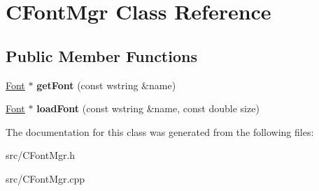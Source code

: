 \hypertarget{class_c_font_mgr}{
\section{CFontMgr Class Reference}
\label{class_c_font_mgr}
}
\subsection*{Public Member Functions}
\begin{DoxyCompactItemize}
\item 
\hypertarget{class_c_font_mgr_a9c467342ba57f52015d52c10b2da1b04}{
\hyperlink{class_font}{Font} $\ast$ {\bfseries getFont} (const wstring \&name)}
\label{class_c_font_mgr_a9c467342ba57f52015d52c10b2da1b04}

\item 
\hypertarget{class_c_font_mgr_a9a03a0f0cf8fc24d0ac9b2764b7cec4c}{
\hyperlink{class_font}{Font} $\ast$ {\bfseries loadFont} (const wstring \&name, const double size)}
\label{class_c_font_mgr_a9a03a0f0cf8fc24d0ac9b2764b7cec4c}

\end{DoxyCompactItemize}


The documentation for this class was generated from the following files:\begin{DoxyCompactItemize}
\item 
src/CFontMgr.h\item 
src/CFontMgr.cpp\end{DoxyCompactItemize}
